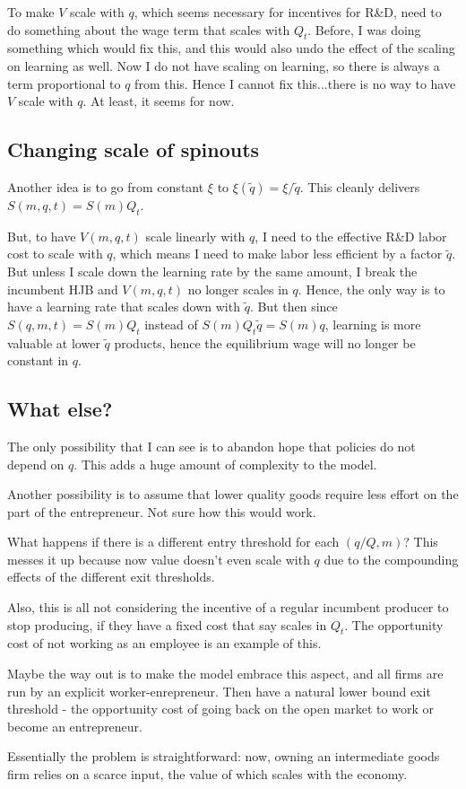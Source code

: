 \documentclass[12pt,english]{article}
\theoremstyle{remark}
\begin{document}
To make $V$ scale with $q$, which seems necessary for incentives for R\&D, need to do something about the wage term that scales with $Q_t$. Before, I was doing something which would fix this, and this would also undo the effect of the scaling on learning as well. Now I do not have scaling on learning, so there is always a term proportional to $q$ from this. Hence I cannot fix this...there is no way to have $V$ scale with $q$. At least, it seems for now. 

\subsection{Changing scale of spinouts}

Another idea is to go from constant $\xi$ to $\xi(\tilde{q}) = \xi / \tilde{q}$. This cleanly delivers $S(m,q,t) = S(m) Q_t$.

But, to have $V(m,q,t)$ scale linearly with $q$, I need to the effective R\&D labor cost to scale with $q$, which means I need to make labor less efficient by a factor $\tilde{q}$. But unless I scale down the learning rate by the same amount, I break the incumbent HJB and $V(m,q,t)$ no longer scales in $q$. Hence, the only way is to have a learning rate that scales down with $\tilde{q}$. But then since $S(q,m,t) = S(m) Q_t$ instead of $S(m) Q_t \tilde{q} = S(m) q$, learning is more valuable at lower $\tilde{q}$ products, hence the equilibrium wage will no longer be constant in $q$.

\subsection{What else?}

The only possibility that I can see is to abandon hope that policies do not depend on $q$. This adds a huge amount of complexity to the model. 

Another possibility is to assume that lower quality goods require less effort on the part of the entrepreneur. Not sure how this would work.

What happens if there is a different entry threshold for each $(q/Q,m)$? This messes it up because now value doesn't even scale with $q$ due to the compounding effects of the different exit thresholds. 

Also, this is all not considering the incentive of a regular incumbent producer to stop producing, if they have a fixed cost that say scales in $Q_t$. The opportunity cost of not working as an employee is an example of this. 

Maybe the way out is to make the model embrace this aspect, and all firms are run by an explicit worker-enrepreneur. Then have a natural lower bound exit threshold - the opportunity cost of going back on the open market to work or become an entrepreneur.

Essentially the problem is straightforward: now, owning an intermediate goods firm relies on a scarce input, the value of which scales with the economy. 










 
\end{document}
